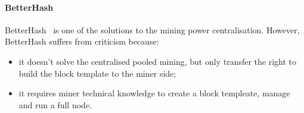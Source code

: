 \paragraph{\textbf{BetterHash}}
BetterHash~\cite{draft-bip-BetterHash} is one of the solutions to the mining power centralisation.
However, BetterHash suffers from criticism because:
\begin{itemize}
\renewcommand\labelitemi{$\circ$}
    \item it doesn't solve the centralised pooled mining, but only transfer the right to build the block template to the miner side;
    \item it requires miner technical knowledge to create a block templeate, manage and run a full node.
\end{itemize}
